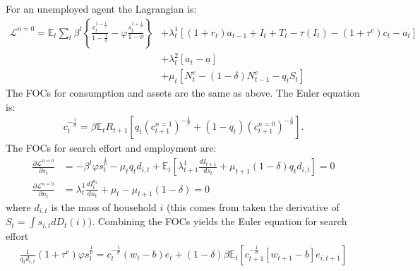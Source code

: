 For an unemployed agent the Lagrangian is: 
\begin{align*}
\mathcal{L}^{n=0}=\mathbb{E}_{t}\sum_{t}\beta^{t}\left\{ \frac{c_{t}^{1-\frac{1}{\sigma}}}{1-\frac{1}{\sigma}}-\varphi\frac{s_{t}^{1+\frac{1}{\nu}}}{1-\nu}\right\} &+\lambda_{t}^{1}\left[\left(1+r_{t}\right)a_{t-1}+I_{t}+T_{t}-\tau\left(I_{t}\right)-\left(1+\tau^{c}\right)c_{t}-a_{t}\right]\\
&+\lambda_{t}^{2}\left[a_{t}-\underline{a}\right] \\
&+\mu_{t}\left[N_{t}^{e}-\left(1-\delta\right)N_{t-1}^{e}-q_{t}S_{t}\right]
\end{align*}
The FOCs for consumption and assets are the same as above. The Euler equation is: 
\begin{align*}
c_{t}^{-\frac{1}{\sigma}}=\beta\mathbb{E}_{t}R_{t+1}\left[q_{t}\left(c_{t+1}^{n=1}\right)^{-\frac{1}{\sigma}}+\left(1-q_{t}\right)\left(c_{t+1}^{n=0}\right)^{-\frac{1}{\sigma}}\right].
\end{align*}
The FOCs for search effort and employment are: 
\begin{align*}
\frac{\partial\mathcal{L}^{n=0}}{\partial s_{t}}&=-\beta^{t}\varphi s_{t}^{\frac{1}{\nu}}-\mu_{t}q_{t}d_{i,t}+\mathbb{E}_{t}\left[\lambda_{t+1}^{1}\frac{dI_{t+1}}{ds_{t}}+\mu_{t+1}\left(1-\delta\right)q_{t}d_{i,t}\right] = 0 \\
\frac{\partial\mathcal{L}^{n=0}}{\partial n_{t}}&=\lambda_{t}^{1}\frac{dI_{t}^{n_{t}}}{dn_{t}}+\mu_{t}-\mu_{t+1}\left(1-\delta\right)=0
\end{align*}
where $d_{i,t}$ is the mass of household $i$ (this comes from taken the derivative of $S_{t}=\int s_{i,t}dD_{t}\left(i\right)$). 
Combining the FOCs yields the Euler equation for search effort 
\begin{gather*}
\frac{1}{q_{t}d_{i,t}}\left(1+\tau^{c}\right)\varphi s_{t}^{\frac{1}{\nu}}=c_{t}^{-\frac{1}{\sigma}}\left(w_{t}-b\right)e_{t}+\left(1-\delta\right)\beta\mathbb{E}_{t}\left[c_{t+1}^{-\frac{1}{\sigma}}\left[w_{t+1}-b\right]e_{i,t+1}\right]
\end{gather*}






